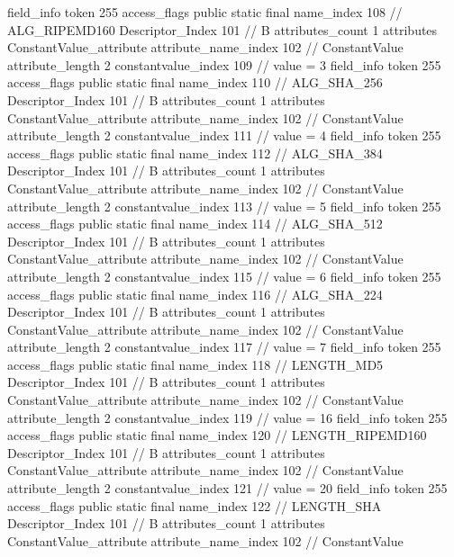 {{{{{{{				}
				}
			}
			field_info {
				token	255
				access_flags	public static final
				name_index	108		// ALG_RIPEMD160
				Descriptor_Index	101		// B
				attributes_count	1
				attributes {
				ConstantValue_attribute {
					attribute_name_index	102		// ConstantValue
					attribute_length	2
					constantvalue_index	109		// value = 3
				}
				}
			}
			field_info {
				token	255
				access_flags	public static final
				name_index	110		// ALG_SHA_256
				Descriptor_Index	101		// B
				attributes_count	1
				attributes {
				ConstantValue_attribute {
					attribute_name_index	102		// ConstantValue
					attribute_length	2
					constantvalue_index	111		// value = 4
				}
				}
			}
			field_info {
				token	255
				access_flags	public static final
				name_index	112		// ALG_SHA_384
				Descriptor_Index	101		// B
				attributes_count	1
				attributes {
				ConstantValue_attribute {
					attribute_name_index	102		// ConstantValue
					attribute_length	2
					constantvalue_index	113		// value = 5
				}
				}
			}
			field_info {
				token	255
				access_flags	public static final
				name_index	114		// ALG_SHA_512
				Descriptor_Index	101		// B
				attributes_count	1
				attributes {
				ConstantValue_attribute {
					attribute_name_index	102		// ConstantValue
					attribute_length	2
					constantvalue_index	115		// value = 6
				}
				}
			}
			field_info {
				token	255
				access_flags	public static final
				name_index	116		// ALG_SHA_224
				Descriptor_Index	101		// B
				attributes_count	1
				attributes {
				ConstantValue_attribute {
					attribute_name_index	102		// ConstantValue
					attribute_length	2
					constantvalue_index	117		// value = 7
				}
				}
			}
			field_info {
				token	255
				access_flags	public static final
				name_index	118		// LENGTH_MD5
				Descriptor_Index	101		// B
				attributes_count	1
				attributes {
				ConstantValue_attribute {
					attribute_name_index	102		// ConstantValue
					attribute_length	2
					constantvalue_index	119		// value = 16
				}
				}
			}
			field_info {
				token	255
				access_flags	public static final
				name_index	120		// LENGTH_RIPEMD160
				Descriptor_Index	101		// B
				attributes_count	1
				attributes {
				ConstantValue_attribute {
					attribute_name_index	102		// ConstantValue
					attribute_length	2
					constantvalue_index	121		// value = 20
				}
				}
			}
			field_info {
				token	255
				access_flags	public static final
				name_index	122		// LENGTH_SHA
				Descriptor_Index	101		// B
				attributes_count	1
				attributes {
				ConstantValue_attribute {
					attribute_name_index	102		// ConstantValue
}}}}}}}
